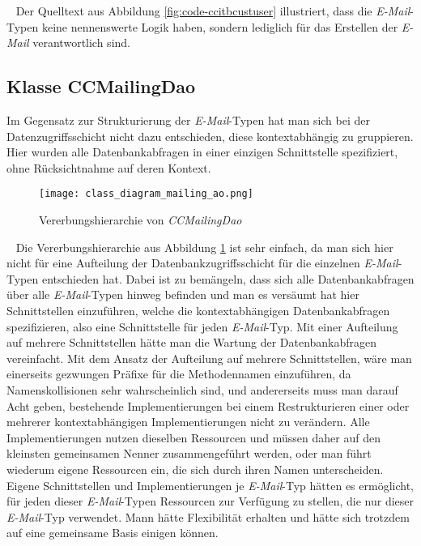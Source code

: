 \ \newline
Der Quelltext aus Abbildung \ref{fig:code-ccitbcustuser} illustriert, dass die \emph{E-Mail}-Typen keine nennenswerte Logik haben, sondern lediglich für das Erstellen der \emph{E-Mail} verantwortlich sind. 

\subsection{Klasse CCMailingDao}
Im Gegensatz zur Strukturierung der \emph{E-Mail}-Typen hat man sich bei der Datenzugriffsschicht nicht dazu entschieden, diese kontextabhängig zu gruppieren. Hier wurden alle Datenbankabfragen in einer einzigen Schnittstelle spezifiziert, ohne Rücksichtnahme auf deren Kontext.
\newline
\begin{figure}[h]
\centering
\texttt{[image: class\_diagram\_mailing\_ao.png]} 
\caption{Vererbungshierarchie von \emph{CCMailingDao}}
\label{fig:klassen-hierarchie-ccmailingdao}
\end{figure}
\ \newline
Die Vererbungshierarchie aus Abbildung \ref{fig:klassen-hierarchie-ccmailingdao} ist sehr einfach, da man sich hier nicht für eine Aufteilung der Datenbankzugriffsschicht für die einzelnen \emph{E-Mail}-Typen entschieden hat. Dabei ist zu bemängeln, dass sich alle Datenbankabfragen über alle \emph{E-Mail}-Typen hinweg befinden und man es versäumt hat hier Schnittstellen einzuführen, welche die kontextabhängigen Datenbankabfragen spezifizieren,  also eine Schnittstelle für jeden \emph{E-Mail}-Typ. Mit einer Aufteilung auf mehrere Schnittstellen hätte man die Wartung der Datenbankabfragen vereinfacht. Mit dem Ansatz der Aufteilung auf mehrere Schnittstellen, wäre man einerseits gezwungen Präfixe für die Methodennamen einzuführen, da Namenskollisionen sehr wahrscheinlich sind, und andererseits muss man darauf Acht geben, bestehende Implementierungen bei einem Restrukturieren einer oder mehrerer kontextabhängigen Implementierungen nicht zu verändern. 
\newline
\newline
Alle Implementierungen nutzen dieselben Ressourcen und müssen daher auf den kleinsten gemeinsamen Nenner zusammengeführt werden, oder man führt wiederum eigene Ressourcen ein, die sich durch ihren Namen unterscheiden. 
\newline
\newline
Eigene Schnittstellen und Implementierungen je \emph{E-Mail}-Typ hätten es ermöglicht, für jeden dieser \emph{E-Mail}-Typen Ressourcen zur Verfügung zu stellen, die nur dieser \emph{E-Mail}-Typ verwendet. Mann hätte Flexibilität erhalten und hätte sich trotzdem auf eine gemeinsame Basis einigen können. 

